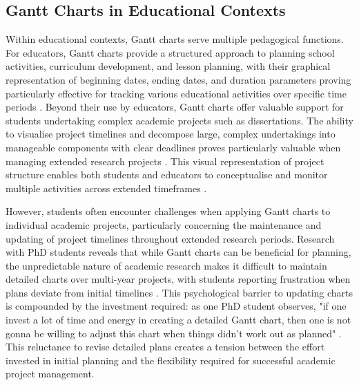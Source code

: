 \documentclass[12pt,nonacm,acmlarge,titlepage,screen]{acmart}
\begin{document}

\subsection{Gantt Charts in Educational Contexts} \label{sec:back_gantt_edu}

Within educational contexts, Gantt charts serve multiple pedagogical functions. For educators, Gantt charts provide a structured approach to planning school activities, curriculum development, and lesson planning, with their graphical representation of beginning dates, ending dates, and duration parameters proving particularly effective for tracking various educational activities over specific time periods \cite{BednjanecAndrea2013AoGc}. Beyond their use by educators, Gantt charts offer valuable support for students undertaking complex academic projects such as dissertations. The ability to visualise project timelines and decompose large, complex undertakings into manageable components with clear deadlines proves particularly valuable when managing extended research projects \cite{Shives2015}. This visual representation of project structure enables both students and educators to conceptualise and monitor multiple activities across extended timeframes \cite{BednjanecAndrea2013AoGc}.

However, students often encounter challenges when applying Gantt charts to individual academic projects, particularly concerning the maintenance and updating of project timelines throughout extended research periods. Research with PhD students reveals that while Gantt charts can be beneficial for planning, the unpredictable nature of academic research makes it difficult to maintain detailed charts over multi-year projects, with students reporting frustration when plans deviate from initial timelines \cite{academiac_gantt_phd_2018}. This psychological barrier to updating charts is compounded by the investment required: as one PhD student observes, "if one invest a lot of time and energy in creating a detailed Gantt chart, then one is not gonna be willing to adjust this chart when things didn't work out as planned" \cite{academiac_gantt_phd_2018}. This reluctance to revise detailed plans creates a tension between the effort invested in initial planning and the flexibility required for successful academic project management.
\end{document}
